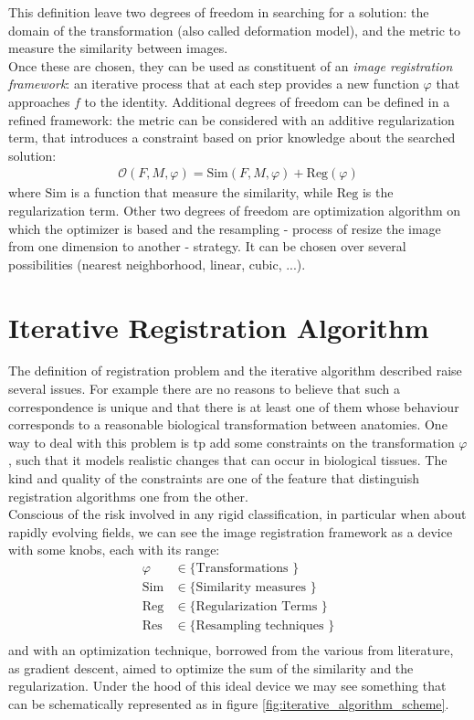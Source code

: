 \noindent
This definition leave two degrees of freedom in searching for a solution: the domain of the transformation (also called deformation model), and the metric to measure the similarity between images. \\
Once these are chosen, they can be used as constituent of an \emph{image registration framework}: an iterative process that at each step provides a new function $\varphi$ that approaches $f$ to the identity.
Additional degrees of freedom can be defined in a refined framework: the metric can be considered with an additive regularization term, that introduces a constraint based on prior knowledge about the searched solution:
\begin{align}\label{eq:general_cost_function}
\mathcal{O}(F, M, \varphi) = \text{Sim}(F,M,\varphi) + \text{Reg}(\varphi) 
\end{align}
where $\text{Sim}$ is a function that measure the similarity, while $\text{Reg}$ is the regularization term.
Other two degrees of freedom are optimization algorithm on which the optimizer is based and the resampling - process of resize the image from one dimension to another - strategy. It can be chosen over several possibilities (nearest neighborhood, linear, cubic, ...).

\section{Iterative Registration Algorithm}

The definition of registration problem and the iterative algorithm described raise several issues. For example there are no reasons to believe that such a correspondence is unique and that there is at least one of them whose behaviour corresponds to a reasonable biological transformation between anatomies. One way to deal with this problem is tp add some constraints on the transformation $\varphi$, such that it models realistic changes that can occur in biological tissues. The kind and quality of the constraints are one of the feature that distinguish registration algorithms one from the other. \\
Conscious of the risk involved in any rigid classification, in particular when about rapidly evolving fields, we can see the image registration framework as a device with some knobs, each with its range:
\begin{align*}
\varphi &\in \{ \text{Transformations }\}\\
\text{Sim} &\in \{ \text{Similarity measures }\}\\
\text{Reg} &\in \{ \text{Regularization Terms }\}\\
\text{Res} &\in \{ \text{Resampling techniques }\}\\
\end{align*}
and with an optimization technique, borrowed from the various from literature, as gradient descent, aimed to optimize the sum of the similarity and the regularization.
Under the hood of this ideal device we may see something that can be schematically represented as in figure \ref{fig:iterative_algorithm_scheme}.

